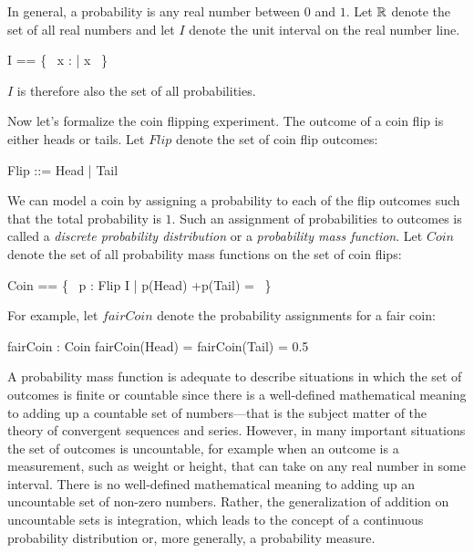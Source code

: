\documentclass{article}
\begin{document}
In general, a probability is any real number between $0$ and $1$.
Let $\mathbb{R}$ denote the set of all real numbers and
let $I$ denote the unit interval on the real number line.
\begin{zed}
	I == \{~ x : \real |  \realzero \realleq x \realleq \realone   ~\}
\end{zed}
$I$ is therefore also the set of all probabilities.

Now let's formalize the coin flipping experiment.
The outcome of a coin flip is either heads or tails.
Let $Flip$ denote the set of coin flip outcomes:
\begin{zed}
	Flip ::= Head | Tail
\end{zed}

\newcommand{\realadd}{+}
\newcommand{\realsub}{-}
\newcommand{\realmul}{*}
\newcommand{\realdiv}{/}


We can model a coin by assigning a probability to each of the flip outcomes such that the total probability is $1$.
Such an assignment of probabilities to outcomes is called a  {\it discrete probability distribution} or a {\it probability mass function}.
Let $Coin$ denote the set of all probability mass functions on the set of coin flips:
\begin{zed}
	Coin == \{~ p : Flip \fun I | p(Head) \realadd p(Tail) = \realone ~\}
\end{zed}

\newcommand{\realonehalf}{0.5}


For example, let $fairCoin$ denote the probability assignments for a fair coin:
\begin{axdef}
	fairCoin : Coin
\where
	fairCoin(Head) = fairCoin(Tail) = \realonehalf
\end{axdef}

A probability mass function is adequate to describe situations in which the set of outcomes is finite or countable since there is a well-defined
mathematical meaning to adding up a countable set of numbers---that is the subject matter of the theory of convergent sequences and series.
However, in many important situations the set of outcomes is uncountable, for example when an outcome is a measurement,
such as weight or height, that can take on any real number in some interval. 
There is no well-defined mathematical meaning to adding up an uncountable set of non-zero numbers.
Rather, the generalization of addition on uncountable sets is integration, which leads to the concept of a continuous probability distribution or, more generally, a probability measure.
\end{document}
